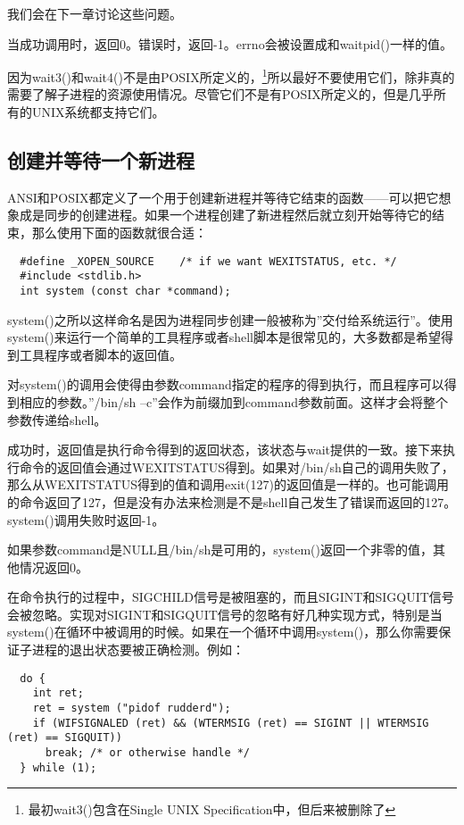 我们会在下一章讨论这些问题。

当成功调用时，返回0。错误时，返回-1。errno会被设置成和waitpid()一样的值。

因为wait3()和wait4()不是由POSIX所定义的，\footnote[1]{最初wait3()包含在Single UNIX Specification中，但后来被删除了}所以最好不要使用它们，除非真的需要了解子进程的资源使用情况。尽管它们不是有POSIX所定义的，但是几乎所有的UNIX系统都支持它们。

\subsection{创建并等待一个新进程}

ANSI和POSIX都定义了一个用于创建新进程并等待它结束的函数——可以把它想象成是同步的创建进程。如果一个进程创建了新进程然后就立刻开始等待它的结束，那么使用下面的函数就很合适：

\begin{lstlisting}
  #define _XOPEN_SOURCE    /* if we want WEXITSTATUS, etc. */
  #include <stdlib.h>
  int system (const char *command);
\end{lstlisting}

system()之所以这样命名是因为进程同步创建一般被称为''交付给系统运行''。使用system()来运行一个简单的工具程序或者shell脚本是很常见的，大多数都是希望得到工具程序或者脚本的返回值。

对system()的调用会使得由参数command指定的程序的得到执行，而且程序可以得到相应的参数。''/bin/sh –c''会作为前缀加到command参数前面。这样才会将整个参数传递给shell。

成功时，返回值是执行命令得到的返回状态，该状态与wait提供的一致。接下来执行命令的返回值会通过WEXITSTATUS得到。如果对/bin/sh自己的调用失败了，那么从WEXITSTATUS得到的值和调用exit(127)的返回值是一样的。也可能调用的命令返回了127，但是没有办法来检测是不是shell自己发生了错误而返回的127。system()调用失败时返回-1。

如果参数command是NULL且/bin/sh是可用的，system()返回一个非零的值，其他情况返回0。

在命令执行的过程中，SIGCHILD信号是被阻塞的，而且SIGINT和SIGQUIT信号会被忽略。实现对SIGINT和SIGQUIT信号的忽略有好几种实现方式，特别是当system()在循环中被调用的时候。如果在一个循环中调用system()，那么你需要保证子进程的退出状态要被正确检测。例如：

\begin{lstlisting}
  do {
    int ret;
    ret = system ("pidof rudderd");
    if (WIFSIGNALED (ret) && (WTERMSIG (ret) == SIGINT || WTERMSIG (ret) == SIGQUIT))
      break; /* or otherwise handle */
  } while (1);
\end{lstlisting}

